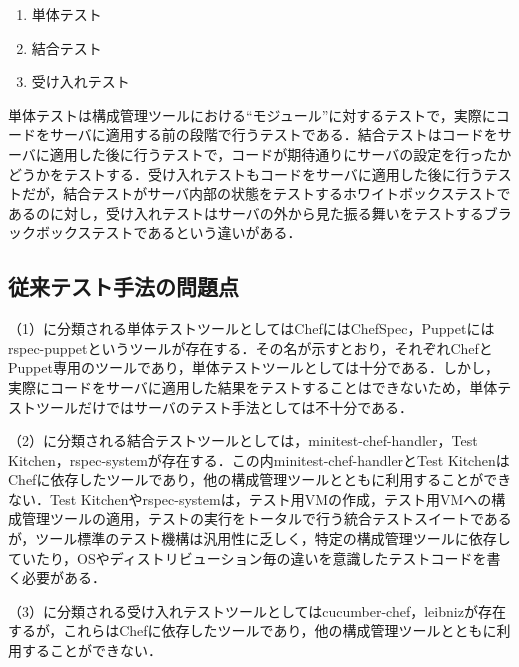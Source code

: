 \begin{enumerate}
  \item 単体テスト
  \item 結合テスト
  \item 受け入れテスト
\end{enumerate}

単体テストは構成管理ツールにおける``モジュール''に対するテストで，実際にコードをサーバに適用する前の段階で行うテストである．結合テストはコードをサーバに適用した後に行うテストで，コードが期待通りにサーバの設定を行ったかどうかをテストする．受け入れテストもコードをサーバに適用した後に行うテストだが，結合テストがサーバ内部の状態をテストするホワイトボックステストであるのに対し，受け入れテストはサーバの外から見た振る舞いをテストするブラックボックステストであるという違いがある．

\subsection{従来テスト手法の問題点}

（1）に分類される単体テストツールとしてはChefにはChefSpec，Puppetにはrspec-puppetというツールが存在する．その名が示すとおり，それぞれChefとPuppet専用のツールであり，単体テストツールとしては十分である．しかし，実際にコードをサーバに適用した結果をテストすることはできないため，単体テストツールだけではサーバのテスト手法としては不十分である．

（2）に分類される結合テストツールとしては，minitest-chef-handler，Test Kitchen，rspec-systemが存在する．この内minitest-chef-handlerとTest KitchenはChefに依存したツールであり，他の構成管理ツールとともに利用することができない．Test Kitchenやrspec-systemは，テスト用VMの作成，テスト用VMへの構成管理ツールの適用，テストの実行をトータルで行う統合テストスイートであるが，ツール標準のテスト機構は汎用性に乏しく，特定の構成管理ツールに依存していたり，OSやディストリビューション毎の違いを意識したテストコードを書く必要がある．

（3）に分類される受け入れテストツールとしてはcucumber-chef，leibnizが存在するが，これらはChefに依存したツールであり，他の構成管理ツールとともに利用することができない．


